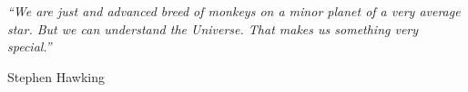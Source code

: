 \documentclass[a4paper, 11pt, oneside]{Thesis}  %
\begin{document}
 
 
 
 
 
 

\pagestyle{empty}  %

\null\vfill
\textit{``We are just and advanced breed of monkeys on a minor planet of a very average star. But we can understand the Universe. That makes us something very special.''}

\begin{flushright}
Stephen Hawking
\end{flushright}

\vfill\vfill\vfill\vfill\vfill\vfill\null
\clearpage  %
\end{document}
